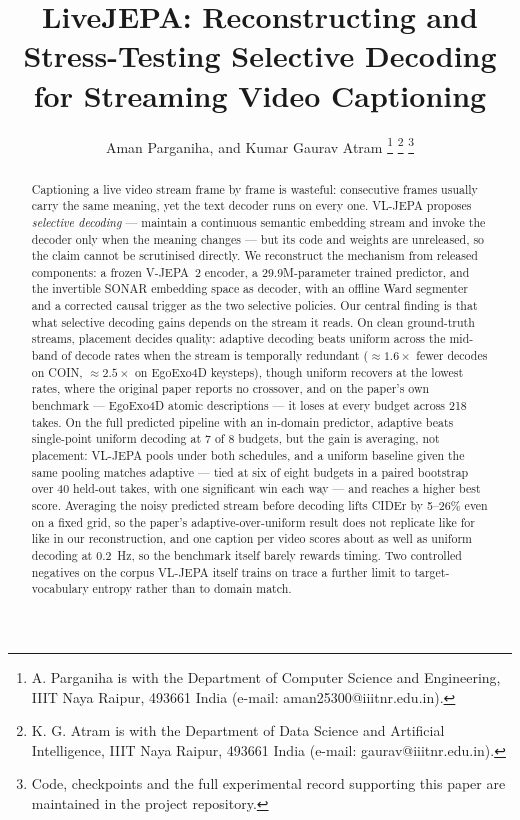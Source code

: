 \documentclass[journal]{IEEEtran}
\begin{document}
\title{LiveJEPA: Reconstructing and Stress-Testing Selective Decoding for
Streaming Video Captioning}

\author{Aman Parganiha, and Kumar Gaurav Atram%
\thanks{A. Parganiha is with the Department of Computer Science and Engineering,
IIIT Naya Raipur, 493661 India (e-mail: aman25300@iiitnr.edu.in).}%
\thanks{K. G. Atram is with the Department of Data Science and Artificial
Intelligence, IIIT Naya Raipur, 493661 India (e-mail: gaurav@iiitnr.edu.in).}%
\thanks{Code, checkpoints and the full experimental record supporting this paper
are maintained in the project repository.}}

\markboth{}{}

\maketitle

\begin{abstract}
Captioning a live video stream frame by frame is wasteful: consecutive frames
usually carry the same meaning, yet the text decoder runs on every one. VL-JEPA
proposes \emph{selective decoding} --- maintain a continuous semantic embedding
stream and invoke the decoder only when the meaning changes --- but its code and
weights are unreleased, so the claim cannot be scrutinised directly. We
reconstruct the mechanism from released components: a frozen V-JEPA~2 encoder, a
29.9M-parameter trained predictor, and the invertible SONAR embedding space as
decoder, with an offline Ward segmenter and a corrected causal trigger as the two
selective policies. Our central finding is that what selective decoding gains
depends on the stream it reads. On clean ground-truth streams, placement decides
quality: adaptive decoding beats uniform across the mid-band of decode rates when
the stream is temporally redundant ($\approx 1.6\times$ fewer decodes on COIN,
$\approx 2.5\times$ on EgoExo4D keysteps), though uniform recovers at the lowest
rates, where the original paper reports no crossover, and on the paper's own
benchmark --- EgoExo4D atomic descriptions --- it loses at every budget across 218
takes. On the full predicted pipeline with an in-domain predictor, adaptive beats
single-point uniform decoding at 7 of 8 budgets, but the gain is averaging, not
placement: VL-JEPA pools under both schedules, and a uniform baseline given the
same pooling matches adaptive --- tied at six of eight budgets in a paired
bootstrap over 40 held-out takes, with one significant win each way --- and
reaches a higher best score. Averaging the noisy predicted stream before decoding
lifts CIDEr by 5--26\% even on a fixed grid, so the paper's adaptive-over-uniform
result does not replicate like for like in our reconstruction, and one caption per
video scores about as well as uniform decoding at 0.2~Hz, so the benchmark itself
barely rewards timing. Two controlled negatives on the corpus VL-JEPA itself trains
on trace a further limit to target-vocabulary entropy rather than to domain match.
\end{abstract}
\end{document}
